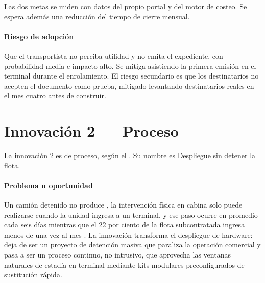 Las dos metas se miden con datos del propio portal y del motor de costeo. Se espera además una
reducción del tiempo de cierre mensual.

\paragraph{Riesgo de adopción} Que el transportista no perciba utilidad y no emita el expediente, con
probabilidad media e impacto alto. Se mitiga asistiendo la primera emisión en el terminal durante el
enrolamiento. El riesgo secundario es que los destinatarios no acepten el documento como prueba,
mitigado levantando destinatarios reales en el mes cuatro antes de construir.


\section{Innovación 2 — Proceso}\label{sec:13-innovacion-2}

La innovación 2 es de proceso, según el . Su nombre es Despliegue sin detener la flota.


\paragraph{Problema u oportunidad} Un camión detenido no produce ,
la intervención física en cabina solo puede realizarse cuando la unidad ingresa a un terminal, y ese
paso ocurre en promedio cada seis días mientras que el 22 por ciento de la flota subcontratada ingresa
menos de una vez al mes . La innovación transforma el despliegue de hardware: deja
de ser un proyecto de detención masiva que paraliza la operación comercial y pasa a ser un proceso
continuo, no intrusivo, que aprovecha las ventanas naturales de estadía en terminal mediante kits
modulares preconfigurados de sustitución rápida.

